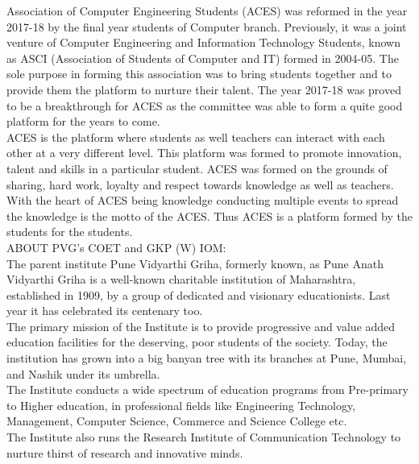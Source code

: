\documentclass[12pt]{article}
\begin{document}
\begin{itemize}
\hspace{1cm}Association of Computer Engineering Students (ACES) was reformed in the year 2017-18 by the final year students of Computer branch. Previously, it was a joint venture of Computer Engineering and Information Technology Students, known as ASCI (Association of Students of Computer and IT) formed in 2004-05. The sole purpose in forming this association was to bring students together and to provide them the platform to nurture their talent. The year 2017-18 was proved to be a breakthrough for ACES as the committee was able to form a quite good platform for the years to come.\\
\smallskip
\hspace{1cm}ACES is the platform where students as well teachers can interact with each other at a very different level. This platform was formed to promote innovation, talent and skills in a particular student. ACES was formed on the grounds of sharing, hard work, loyalty and respect towards knowledge as well as teachers. With the heart of ACES being knowledge conducting multiple events to spread the knowledge is the motto of the ACES. Thus  ACES is a platform formed by the students for the students.\\
\pagebreak
ABOUT PVG’s COET and GKP (W) IOM:\\
\smallskip
\hspace{1cm}The parent institute Pune Vidyarthi Griha, formerly known, as Pune Anath Vidyarthi Griha is a well-known charitable institution of Maharashtra, established in 1909, by a group of dedicated and visionary educationists. Last year it has celebrated its centenary too.\\
\smallskip
\hspace{1cm}The primary mission of the Institute is to provide progressive and value added education facilities for the deserving, poor students of the society. Today, the institution has grown into a big banyan tree with its branches at Pune, Mumbai, and Nashik under its umbrella.\\
\smallskip
\hspace{1cm}The Institute conducts a wide spectrum of education programs from Pre-primary to Higher education, in professional fields like Engineering Technology, Management, Computer Science, Commerce and Science College etc.\\
\hspace{1cm}The Institute also runs the Research Institute of Communication Technology to nurture thirst of research and innovative minds.\\

\end{itemize}
\end{document}
